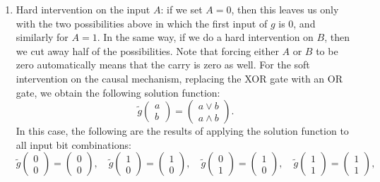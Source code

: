 \begin{enumerate}[label=9.\arabic*]
\begin{gradedsolution}
\begin{enumerate}
            \item {} Hard intervention on the input $A$: if we set $A = 0$, then this leaves us only with the two possibilities above in which the first input of $g$ is $0$, and similarly for $A = 1$.
            In the same way, if we do a hard intervention on $B$, then we cut away half of the possibilities.
            Note that forcing either $A$ or $B$ to be zero automatically means that the carry is zero as well.
            For the soft intervention on the causal mechanism, replacing the XOR gate with an OR gate, we obtain the following solution function:
            \begin{equation}
                \tilde{g} \begin{pmatrix} a \\ b\end{pmatrix} = \begin{pmatrix} a \lor b \\ a \land b \end{pmatrix}.
                \label{eq:new_solution_function}
            \end{equation}
            In this case, the following are the results of applying the solution function to all input bit combinations:
            \begin{equation}
                \tilde{g} \begin{pmatrix} 0 \\ 0\end{pmatrix} = \begin{pmatrix} 0 \\ 0\end{pmatrix}, \quad
                \tilde{g}  \begin{pmatrix} 1 \\ 0\end{pmatrix} = \begin{pmatrix} 1 \\ 0\end{pmatrix}, \quad
                \tilde{g} \begin{pmatrix} 0 \\ 1\end{pmatrix} = \begin{pmatrix} 1 \\ 0\end{pmatrix}, \quad
                \tilde{g} \begin{pmatrix} 1 \\ 1\end{pmatrix} = \begin{pmatrix} 1 \\ 1\end{pmatrix},

\end{equation}
\end{enumerate}
\end{gradedsolution}
\end{enumerate}
